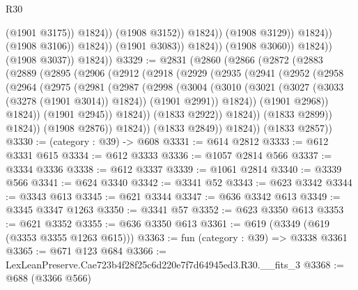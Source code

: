 \begin{lexlean}{R30}
\begin{coremodule}
                                              (@1901 @3175))
                                            @1824))
                                        (@1908 @3152))
                                      @1824))
                                  (@1908 @3129))
                                @1824))
                            (@1908 @3106))
                          @1824))
                      (@1901 @3083))
                    @1824))
                (@1908 @3060))
              @1824))
          (@1908 @3037))
        @1824))
@3329 := @2831
    (@2860
      (@2866
        (@2872
          (@2883
            (@2889
              (@2895
                (@2906
                  (@2912
                    (@2918
                      (@2929
                        (@2935
                          (@2941
                            (@2952
                              (@2958
                                (@2964
                                  (@2975
                                    (@2981
                                      (@2987
                                        (@2998
                                          (@3004
                                            (@3010
                                              (@3021
                                                (@3027 (@3033 (@3278 (@1901 @3014)) @1824))
                                                (@1901 @2991))
                                              @1824))
                                          (@1901 @2968))
                                        @1824))
                                    (@1901 @2945))
                                  @1824))
                              (@1833 @2922))
                            @1824))
                        (@1833 @2899))
                      @1824))
                  (@1908 @2876))
                @1824))
            (@1833 @2849))
          @1824))
      (@1833 @2857))
@3330 := (category : @39) -> @608
@3331 := @614 @2812
@3333 := @612 @3331 @615
@3334 := @612 @3333
@3336 := @1057 @2814 @566
@3337 := @3334 @3336
@3338 := @612 @3337
@3339 := @1061 @2814
@3340 := @3339 @566
@3341 := @624 @3340
@3342 := @3341 @52
@3343 := @623 @3342
@3344 := @3343 @613
@3345 := @621 @3344
@3347 := @636 @3342 @613
@3349 := @3345 @3347 @1263
@3350 := @3341 @57
@3352 := @623 @3350 @613
@3353 := @621 @3352
@3355 := @636 @3350 @613
@3361 := @619 (@3349 (@619 (@3353 @3355 @1263 @615)))
@3363 := fun (category : @39) => @3338 @3361
@3365 := @671 @123 @684
@3366 := LexLeanPreserve.Cae723b4f28f25c6d220e7f7d64945ed3.R30.__fits_3
@3368 := @688 (@3366 @566)

\end{coremodule}
\end{lexlean}
